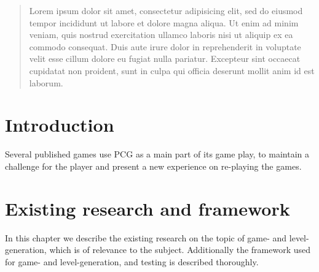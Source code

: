 \documentclass[a4paper,titlepage,final, twoside]{report}
\begin{document}

\setcounter{page}{0}

\begin{spacing}{1.5}
\begin{abstract}
	Lorem ipsum dolor sit amet, consectetur adipisicing elit, sed do eiusmod tempor incididunt ut labore et dolore magna aliqua. Ut enim ad minim veniam, quis nostrud exercitation ullamco laboris nisi ut aliquip ex ea commodo consequat. Duis aute irure dolor in reprehenderit in voluptate velit esse cillum dolore eu fugiat nulla pariatur. Excepteur sint occaecat cupidatat non proident, sunt in culpa qui officia deserunt mollit anim id est laborum.
\end{abstract}
\end{spacing}

\tableofcontents
\newpage


\chapter{Introduction}
Several published games use PCG as a main part of its game play, to maintain a challenge for the player and present a new experience on re-playing the games.

\chapter{Existing research and framework}
In this chapter we describe the existing research on the topic of game- and level-generation, which is of relevance to the subject.
Additionally the framework used for game- and level-generation, and testing is described thoroughly.
\end{document}
